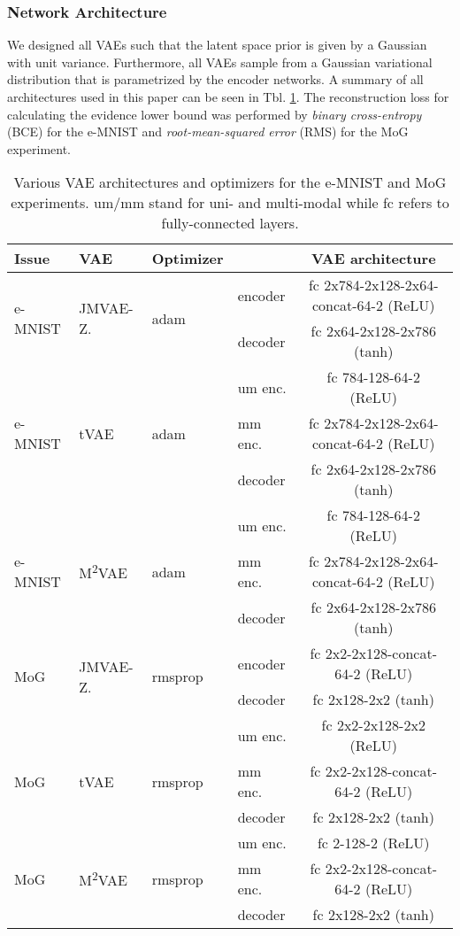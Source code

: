 \subsubsection{Network Architecture}
\label{sec:jmvae_e_mnist_setup}

We designed all VAEs such that the latent space prior is given by a Gaussian with unit variance.
%
Furthermore, all VAEs sample from a Gaussian variational distribution that is parametrized by the encoder networks.
%
A summary of all architectures used in this paper can be seen in Tbl. \ref{tab:architectures}.
%
The reconstruction loss for calculating the evidence lower bound was performed by \textit{binary cross-entropy} (BCE) for the e-MNIST and \textit{root-mean-squared error} (RMS) for the MoG experiment.
%
\begin{table}[h]
	\caption{Various VAE architectures and optimizers for the e-MNIST and MoG experiments. um/mm stand for uni- and multi-modal while fc refers to fully-connected layers.}
	\label{tab:architectures}
	\centering
	\begin{tabular}{llllc}
		\textbf{Issue} & \textbf{VAE} & \textbf{Optimizer} &  & \textbf{VAE architecture} \\ \hline
        \multirow{2}{*}{e-MNIST}        & \multirow{2}{*}{JMVAE-Z.} & \multirow{2}{*}{adam} & encoder & fc 2x784-2x128-2x64-concat-64-2 (ReLU) \\
		 &   &  & decoder & fc 2x64-2x128-2x786 (tanh) \\ \hline
		        &            &      & um enc. & fc 784-128-64-2 (ReLU) \\
		e-MNIST & tVAE       & adam & mm enc. & fc 2x784-2x128-2x64-concat-64-2 (ReLU) \\
		        &            &      & decoder & fc 2x64-2x128-2x786 (tanh) \\ \hline
		        &            &      & um enc. & fc 784-128-64-2 (ReLU) \\
		e-MNIST & M\textsuperscript{2}VAE & adam & mm enc. & fc 2x784-2x128-2x64-concat-64-2 (ReLU) \\
		        &            &      & decoder & fc 2x64-2x128-2x786 (tanh) \\ \hline
		\multirow{2}{*}{MoG} & \multirow{2}{*}{JMVAE-Z.} & \multirow{2}{*}{rmsprop} & encoder & fc 2x2-2x128-concat-64-2 (ReLU) \\
		    &            &         & decoder & fc 2x128-2x2 (tanh) \\ \hline
		    &            &         & um enc. & fc 2x2-2x128-2x2 (ReLU) \\
		MoG & tVAE       & rmsprop & mm enc. & fc 2x2-2x128-concat-64-2 (ReLU) \\
		    &            &         & decoder & fc 2x128-2x2 (tanh) \\ \hline
	  	    &            &         & um enc. & fc 2-128-2 (ReLU) \\
		MoG & M\textsuperscript{2}VAE & rmsprop & mm enc. & fc 2x2-2x128-concat-64-2 (ReLU) \\
		    &            &         & decoder & fc 2x128-2x2 (tanh) \\ 
	\end{tabular}
\end{table}

